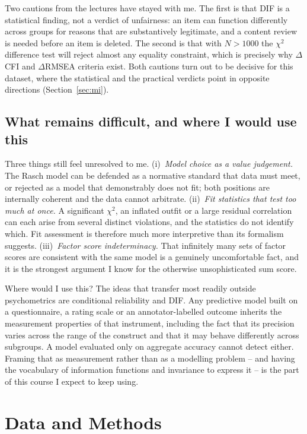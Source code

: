\documentclass[11pt,a4paper]{article}
\begin{document}
Two cautions from the lectures have stayed with me. The first is that DIF is a
statistical finding, not a verdict of unfairness: an item can function differently
across groups for reasons that are substantively legitimate, and a content review
is needed before an item is deleted. The second is that with $N>1000$ the
$\chi^2$ difference test will reject almost any equality constraint, which is
precisely why $\Delta$CFI and $\Delta$RMSEA criteria exist. Both cautions turn out
to be decisive for this dataset, where the statistical and the practical verdicts
point in opposite directions (Section~\ref{sec:mi}).

\subsection{What remains difficult, and where I would use this}

Three things still feel unresolved to me. (i)~\emph{Model choice as a value
judgement.} The Rasch model can be defended as a normative standard that data
must meet, or rejected as a model that demonstrably does not fit; both positions
are internally coherent and the data cannot arbitrate. (ii)~\emph{Fit statistics
that test too much at once.} A significant $\chi^2$, an inflated outfit or a large
residual correlation can each arise from several distinct violations, and the
statistics do not identify which. Fit assessment is therefore much more
interpretive than its formalism suggests. (iii)~\emph{Factor score
indeterminacy.} That infinitely many sets of factor scores are consistent with the
same model is a genuinely uncomfortable fact, and it is the strongest argument I
know for the otherwise unsophisticated sum score.

Where would I use this? The ideas that transfer most readily outside psychometrics
are conditional reliability and DIF. Any predictive model built on a
questionnaire, a rating scale or an annotator-labelled outcome inherits the
measurement properties of that instrument, including the fact that its precision
varies across the range of the construct and that it may behave differently across
subgroups. A model evaluated only on aggregate accuracy cannot detect either.
Framing that as measurement rather than as a modelling problem -- and having the
vocabulary of information functions and invariance to express it -- is the part of
this course I expect to keep using.
\section{Data and Methods}\label{sec:methods}
\end{document}

